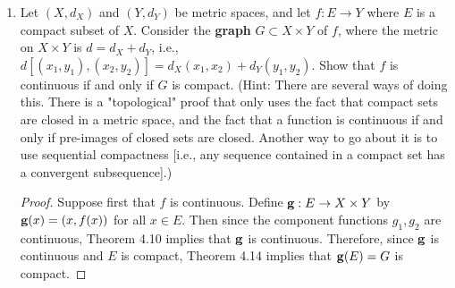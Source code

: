 \documentclass[../psets.tex]{subfiles}
\begin{document}
\begin{enumerate}[label={\textbf{\arabic*.}}]
\begin{proof}
        Suppose first that $x=a_i$ for some $i$ and $x\neq b_j$ for any $j$. To prove that $g$ is continuous at $x$, it will suffice to show that $g(x+)=g(x-)=g(x)$. Since $x=a_i$, we can show by an argument analogous to that used in the second case that $g(x+)=f(a_i)=g(x)$. Additionally, since $x\neq b_j$ for any $j$, there exists $(y,x]\subset E$ for some $y<x$. Thus, we can show by an argument analogous to that used in the first case that $g(x-)=f(x-)=f(x)=g(x)$.\par
        The proof of the second subsubcase is symmetric to that of the first.\par
        For the third subsubcase, simply apply the first part of the proof of the first subsubcase twice, once to each "side" of $x$.\par
        For the second subcase, we know that if $x\in E\setminus E^\circ$, then $x\in E$, so $\lim_{y\to x}f(y)=f(x)$. This combined with the fact that $x\in E'$ implies that $y$ can actually approach $x$. Moreover, we know by the definition of $g$ that if $f$ is bounded in sufficiently small regions of $x$ (as it is), $g$ will be bounded in sufficiently small regions of $x$ by the same bounds (if points of $g$ exceeded the minimal bounds of $f$, then there would have to be some points of $f$ not extended/connected to each other via a straight line). Therefore, $g$ is continuous at $x$, as desired.
    \end{proof}
    \item Let $(X,d_X)$ and $(Y,d_Y)$ be metric spaces, and let $f:E\to Y$ where $E$ is a compact subset of $X$. Consider the \textbf{graph} $G\subset X\times Y$ of $f$, where the metric on $X\times Y$ is $d=d_X+d_Y$, i.e., $d[(x_1,y_1),(x_2,y_2)]=d_X(x_1,x_2)+d_Y(y_1,y_2)$. Show that $f$ is continuous if and only if $G$ is compact. (Hint: There are several ways of doing this. There is a "topological" proof that only uses the fact that compact sets are closed in a metric space, and the fact that a function is continuous if and only if pre-images of closed sets are closed. Another way to go about it is to use sequential compactness [i.e., any sequence contained in a compact set has a convergent subsequence].)
    \begin{proof}
        Suppose first that $f$ is continuous. Define $\mathbf{g}:E\to X\times Y$ by $\mathbf{g}(x)=(x,f(x))$ for all $x\in E$. Then since the component functions $g_1,g_2$ are continuous, Theorem 4.10 implies that $\mathbf{g}$ is continuous. Therefore, since $\mathbf{g}$ is continuous and $E$ is compact, Theorem 4.14 implies that $\mathbf{g}(E)=G$ is compact.\par

\end{proof}
\end{enumerate}
\end{document}

